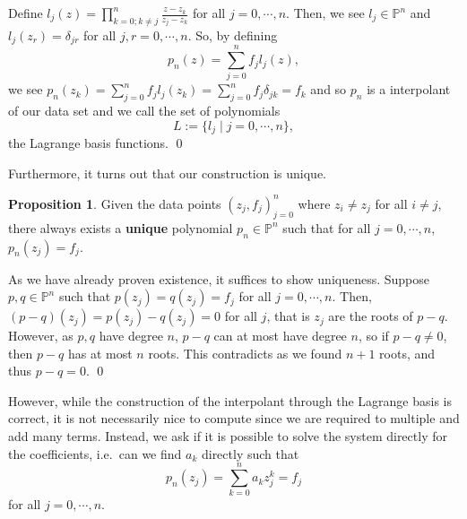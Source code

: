 \documentclass[
]{article}
\theoremstyle{definition}
\newtheorem{prop}{Proposition}
\theoremstyle{definition}
\begin{document}
Define \(l_j(z) = \prod_{k = 0; k \neq j}^n \frac{z - z_k}{z_j - z_k}\)
for all \(j = 0, \cdots, n\). Then, we see \(l_j \in \mathbb{P}^n\) and
\(l_j(z_r) = \delta_{jr}\) for all \(j, r = 0, \cdots, n\). So, by
defining \[p_n(z) = \sum_{j = 0}^n f_j l_j(z),\] we see
\(p_n(z_k) = \sum_{j = 0}^n f_j l_j(z_k) = \sum_{j = 0}^n f_j \delta_{jk} = f_k\)
and so \(p_n\) is a interpolant of our data set and we call the set of
polynomials \[L := \{ l_j \mid j = 0, \cdots, n\},\] the Lagrange basis
functions. \qed

Furthermore, it turns out that our construction is unique.

\begin{prop}
  Given the data points \((z_j, f_j)_{j = 0}^n\) where \(z_i \neq z_j\) for all 
  \(i \neq j\), there always exists a \textbf{unique} polynomial \(p_n \in \mathbb{P}^n\) 
  such that for all \(j = 0, \cdots, n\), \(p_n(z_j) = f_j\).
\end{prop}
\proof

As we have already proven existence, it suffices to show uniqueness.
Suppose \(p, q \in \mathbb{P}^n\) such that \(p(z_j) = q(z_j) = f_j\)
for all \(j = 0, \cdots, n\). Then,
\((p - q)(z_j) = p(z_j) - q(z_j) = 0\) for all \(j\), that is \(z_j\)
are the roots of \(p - q\). However, as \(p, q\) have degree \(n\),
\(p - q\) can at most have degree \(n\), so if \(p - q \neq 0\), then
\(p - q\) has at most \(n\) roots. This contradicts as we found
\(n + 1\) roots, and thus \(p - q = 0\). \qed

However, while the construction of the interpolant through the Lagrange
basis is correct, it is not necessarily nice to compute since we are
required to multiple and add many terms. Instead, we ask if it is
possible to solve the system directly for the coefficients, i.e.~can we
find \(a_k\) directly such that
\[p_n(z_j) = \sum_{k = 0}^n a_k z_j^k = f_j\] for all
\(j = 0, \cdots , n\).
\end{document}

